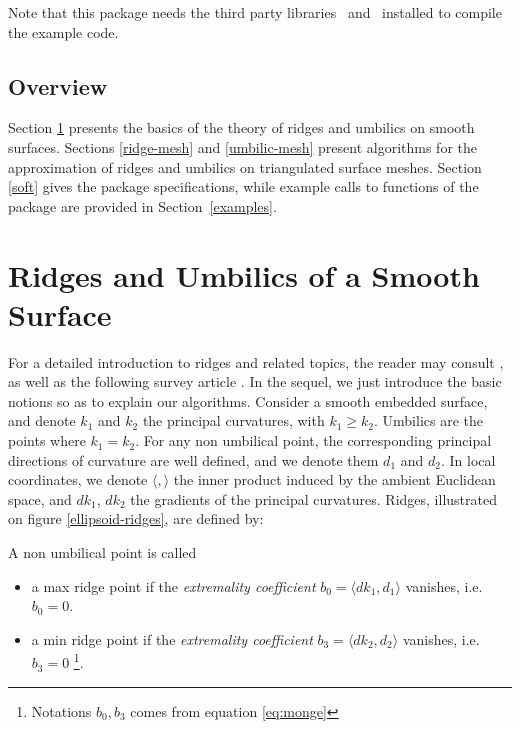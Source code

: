 Note that this package needs the third party libraries
\ccThirdPartyLapack\ and \ccThirdPartyBlas\ installed to compile the example code.

\subsection{Overview}

Section \ref{smooth} presents the basics of the theory of ridges and
umbilics on smooth surfaces. Sections \ref{ridge-mesh} and
\ref{umbilic-mesh} present algorithms for the approximation of ridges and
umbilics on triangulated surface meshes. Section
\ref{soft} gives the package specifications, while example calls to
functions of the package are provided in Section~\ref{examples}.


\section{Ridges and Umbilics of a Smooth Surface}
\label{smooth}

For a detailed introduction to ridges and related topics, the reader
may consult 
\cite{cgal:hgygm-ttdpf-99,cgal:p-gd-01}, as well as
the following survey article \cite{cgal:cp-ssulc-05}.
In the sequel, we just introduce the basic notions so as to explain
our algorithms.  Consider a smooth embedded surface, and denote $k_1$
and $k_2$ the principal curvatures, with $k_1\geq k_2$. Umbilics are
the points where $k_1=k_2$.  For any non umbilical point, the
corresponding principal directions of curvature are well defined, and
we denote them $d_1$ and $d_2$.
In local coordinates, we denote $\langle , \rangle$ the inner product
induced by the ambient Euclidean space, and $dk_1$, $dk_2$ the
gradients of the principal curvatures. Ridges, illustrated on figure
\ref{ellipsoid-ridges}, are defined by:

\begin{definition}
\label{def:ridge-extrema}
A non umbilical point is called
\begin{itemize}
\item
a max ridge point if the {\em extremality coefficient} $b_0=\langle
dk_1,d_1 \rangle$ vanishes, i.e. $b_0=0$.

\item a min ridge point if the {\em extremality coefficient}
  $b_3=\langle dk_2,d_2 \rangle$ vanishes, i.e. $b_3=0$
  \footnote{Notations $b_0, b_3$ comes from equation \ref{eq:monge} }.
\end{itemize}
\end{definition}


